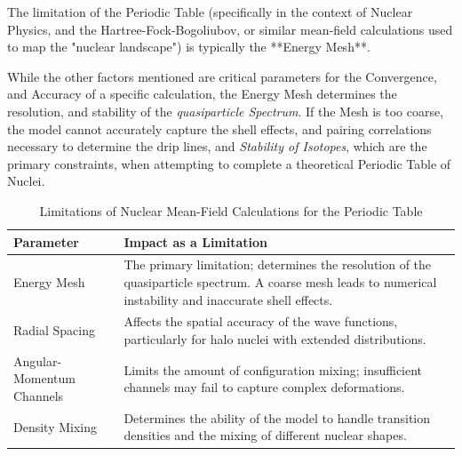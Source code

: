\documentclass[a4paper, 10pt, onepage]{elegantbook}
\begin{document}
The limitation of the Periodic Table (specifically in the context of Nuclear Physics, and the Hartree-Fock-Bogoliubov, or similar mean-field calculations used to map the "nuclear landscape") is typically the **Energy Mesh**.

While the other factors mentioned are critical parameters for the Convergence, and Accuracy of a specific calculation, the Energy Mesh determines the resolution, and stability of the \emph{quasiparticle Spectrum}. If the Mesh is too coarse, the model cannot accurately capture the shell effects, and pairing correlations necessary to determine the drip lines, and \emph{Stability of Isotopes}, which are the primary constraints, when attempting to complete a theoretical Periodic Table of Nuclei.

\begin{table}[h]
\centering
\begin{tabular}{|l|p{8cm}|}
\hline
\textbf{Parameter} & \textbf{Impact as a Limitation} \\ \hline
Energy Mesh & The primary limitation; determines the resolution of the quasiparticle spectrum. A coarse mesh leads to numerical instability and inaccurate shell effects. \\ \hline
Radial Spacing & Affects the spatial accuracy of the wave functions, particularly for halo nuclei with extended distributions. \\ \hline
Angular-Momentum Channels & Limits the amount of configuration mixing; insufficient channels may fail to capture complex deformations. \\ \hline
Density Mixing & Determines the ability of the model to handle transition densities and the mixing of different nuclear shapes. \\ \hline
\end{tabular}
\caption{Limitations of Nuclear Mean-Field Calculations for the Periodic Table}
\end{table}

\newpage
\end{document}
